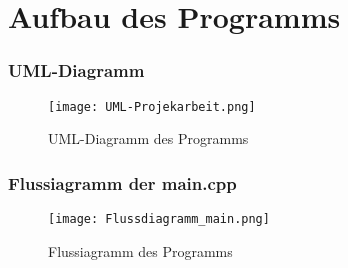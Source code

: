 \documentclass{beamer}
\begin{document}
\section{Aufbau des Programms}

\begin{frame} %
  \frametitle{UML-Diagramm} %
  \begin{figure}[htb]
		\centering
		\texttt{[image: UML-Projekarbeit.png]}
		\caption{UML-Diagramm des Programms}
  \end{figure}
\end{frame}

\begin{frame} %
  \frametitle{Flussiagramm der main.cpp} %
  \begin{figure}[htb]
		\centering
		\texttt{[image: Flussdiagramm\_main.png]}
		\caption{Flussiagramm des Programms}
  \end{figure}
\end{frame}
\end{document}
